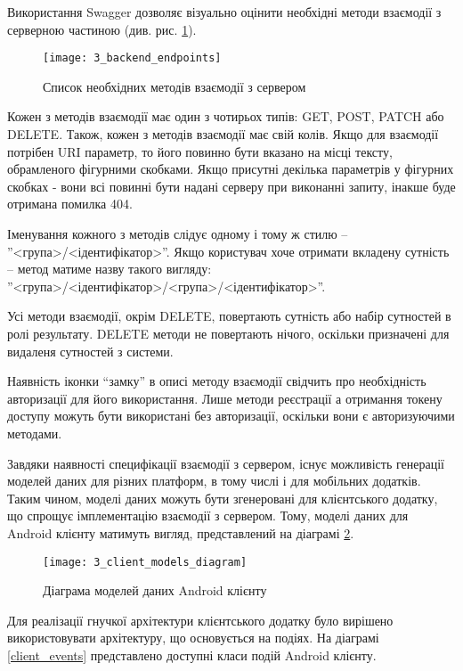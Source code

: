 \documentclass[../main.tex]{subfiles}
\begin{document}
Використання Swagger дозволяє візуально оцінити необхідні методи взаємодії з серверною частиною (див. рис. \ref{available_rest_endpoints}).

\begin{figure}[H]
	\centering
	\texttt{[image: 3\_backend\_endpoints]}
	\caption{Список необхідних методів взаємодії з сервером}
	\label{available_rest_endpoints}
\end{figure}

Кожен з методів взаємодії має один з чотирьох типів: GET, POST, PATCH або DELETE. Також, кожен з методів взаємодії має свій колів. Якщо для взаємодії потрібен URI параметр, то його повинно бути вказано на місці тексту, обрамленого фігурними скобками. Якщо присутні декілька параметрів у фігурних скобках - вони всі повинні бути надані серверу при виконанні запиту, інакше буде отримана помилка 404.

Іменування кожного з методів слідує одному і тому ж стилю -- ''<група>/<ідентифікатор>''. Якщо користувач хоче отримати вкладену сутність -- метод матиме назву такого вигляду: ''<група>/<ідентифікатор>/<група>/<ідентифікатор>''.

Усі методи взаємодії, окрім DELETE, повертають сутність або набір сутностей в ролі результату. DELETE методи не повертають нічого, оскільки призначені для видаленя сутностей з системи.

Наявність іконки \enquote{замку} в описі методу взаємодії свідчить про необхідність авторизації для його використання. Лише методи реєстрації а отримання токену доступу можуть бути використані без авторизації, оскільки вони є авторизуючими методами.

Завдяки наявності специфікації взаємодії з сервером, існує можливість генерації моделей даних для різних платформ, в тому числі і для мобільних додатків. Таким чином, моделі даних можуть бути згенеровані для клієнтського додатку, що спрощує імплементацію взаємодії з сервером. Тому, моделі даних для Android клієнту матимуть вигляд, представлений на діаграмі \ref{client_models}.

\begin{figure}[H]
	\centering
	\texttt{[image: 3\_client\_models\_diagram]}
	\caption{Діаграма моделей даних Android клієнту}
	\label{client_models}
\end{figure}

Для реалізації гнучкої архітектури клієнтського додатку було вирішено використовувати архітектуру, що основується на подіях. На діаграмі \ref{client_events} представлено доступні класи подій Android клієнту.
\end{document}

